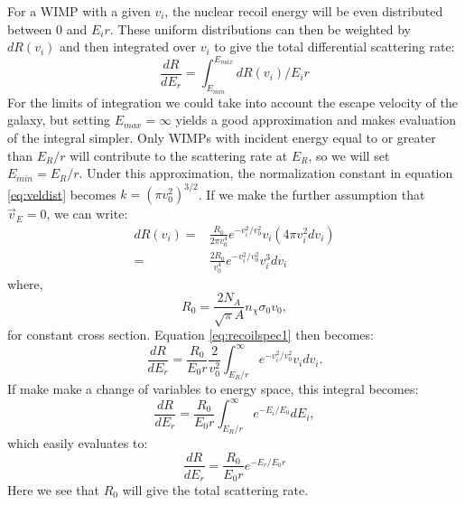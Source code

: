For a WIMP with a given $v_i$, the nuclear recoil energy will be even distributed between 0 and $E_ir$. These uniform distributions can then be weighted by $dR(v_i)$ and then integrated over $v_i$ to give the total differential scattering rate:
\begin{equation} \label{eq:recoilspec1}
\frac{dR}{dE_{r}}=\int_{E_{min}}^{E_{max}}dR(v_i)/E_ir
\end{equation}
For the limits of integration we could take into account the escape velocity of the galaxy, but setting $E_{max}=\infty$ yields a good approximation and makes evaluation of the integral simpler. Only WIMPs with incident energy equal to or greater than $E_R/r$ will contribute to the scattering rate at $E_R$, so we will set $E_{min}=E_R/r$. Under this approximation, the normalization constant in equation \ref{eq:veldist} becomes $k=(\pi v_0^2)^{3/2}$. If we make the further assumption that $\vec{v}_E=0$, we can write:
\begin{equation}
\begin{split}
dR(v_i)=&\frac{R_0}{2\pi v_0^4} e^{-v_i^2/v_0^2}v_i (4\pi v_i^2dv_i)\\
=&\frac{2R_0}{v_0^4} e^{-v_i^2/v_0^2}v_i^3dv_i
\end{split}
\end{equation}
where, 
\begin{equation}
R_0=\frac{2N_A}{\sqrt{\pi}A}n_{\chi}\sigma_0 v_0,
\end{equation}
for constant cross section. Equation \ref{eq:recoilspec1} then becomes:
\begin{equation} \label{eq:recoilspec2}
\frac{dR}{dE_{r}}= \frac{R_0}{E_0 r}\frac{2}{v_0^2} \int_{E_R/r}^{\infty}   e^{-v_i^2/v_0^2}v_idv_i.
\end{equation}
If make make a change of variables to energy space, this integral becomes:
\begin{equation} \label{eq:recoilspec3}
\frac{dR}{dE_{r}}= \frac{R_0}{E_0 r} \int_{E_R/r}^{\infty}   e^{-E_i/E_0}dE_i,
\end{equation}
which easily evaluates to:
\begin{equation} \label{eq:recoilspec4}
\frac{dR}{dE_{r}}=\frac{R_{0}}{E_{0}r}e^{-E_{r}/E_{0}r}
\end{equation}
Here we see that $R_0$ will give the total scattering rate.

